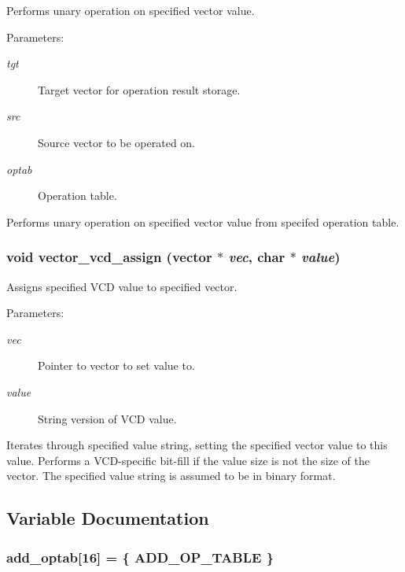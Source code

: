Performs unary operation on specified vector value.

\begin{Desc}
\item[Parameters: ]\par
\begin{description}
\item[{\em 
tgt}]Target vector for operation result storage. \item[{\em 
src}]Source vector to be operated on. \item[{\em 
optab}]Operation table.\end{description}
\end{Desc}
Performs unary operation on specified vector value from specifed operation table. 
\subsubsection{\setlength{\rightskip}{0pt plus 5cm}void vector\_\-vcd\_\-assign ({\bf vector} $\ast$ {\em vec}, char $\ast$ {\em value})}\label{vector_8c_a33}


Assigns specified VCD value to specified vector.

\begin{Desc}
\item[Parameters: ]\par
\begin{description}
\item[{\em 
vec}]Pointer to vector to set value to. \item[{\em 
value}]String version of VCD value.\end{description}
\end{Desc}
Iterates through specified value string, setting the specified vector value to this value. Performs a VCD-specific bit-fill if the value size is not the size of the vector. The specified value string is assumed to be in binary format. 

\subsection{Variable Documentation}
\subsubsection{ add\_\-optab[16] = \{ ADD\_\-OP\_\-TABLE \}}\label{vector_8c_a6}


